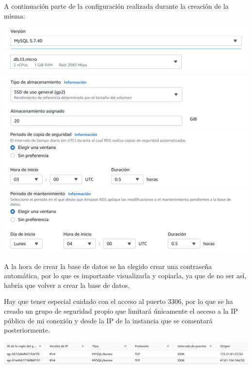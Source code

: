 \documentclass{\ClassPath/viu-tfm-template}
\begin{document}
A continuación parte de la configuración realizada durante la creación de la misma:

\begin{center}
    \includegraphics[width=0.8\linewidth]{img/db1.png}
    \includegraphics[width=0.8\linewidth]{img/db2.png}
    \includegraphics[width=0.8\linewidth]{img/db3.png}
    \includegraphics[width=0.8\linewidth]{img/db4.png}
    \includegraphics[width=0.8\linewidth]{img/db5.png}
\end{center}


A la hora de crear la base de datos se ha elegido crear una contraseña automática, por lo que es importante visualizarla y copiarla, ya que de no ser así, habría que volver a crear la base de datos.


Hay que tener especial cuidado con el acceso al puerto 3306, por lo que se ha creado un grupo de seguridad propio que limitará únicamente el acceso a la IP pública de mi conexión y desde la IP de la instancia que se comentará posteriormente.

\begin{center}
    \includegraphics[frame,width=\linewidth]{img/db-reglas.png}
\end{center}
\end{document}
